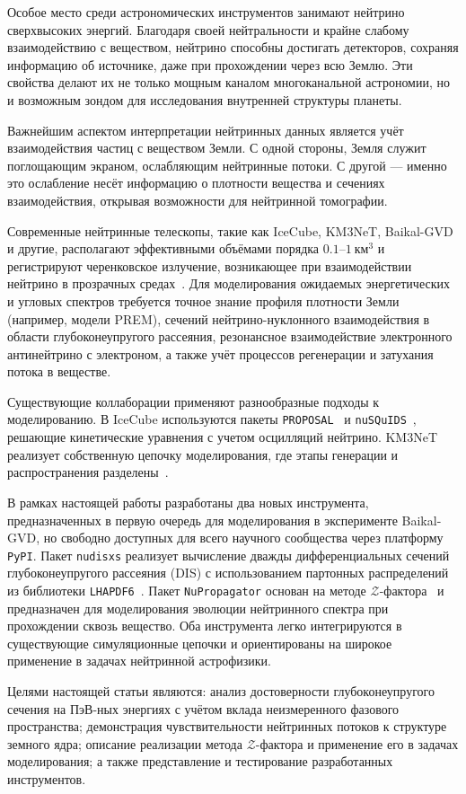 Особое место среди астрономических инструментов занимают нейтрино сверхвысоких энергий. Благодаря своей нейтральности и крайне слабому взаимодействию с веществом, нейтрино способны достигать детекторов, сохраняя информацию об источнике, даже при прохождении через всю Землю. Эти свойства делают их не только мощным каналом многоканальной астрономии, но и возможным зондом для исследования внутренней структуры планеты.

Важнейшим аспектом интерпретации нейтринных данных является учёт взаимодействия частиц с веществом Земли. С одной стороны, Земля служит поглощающим экраном, ослабляющим нейтринные потоки. С другой — именно это ослабление несёт информацию о плотности вещества и сечениях взаимодействия, открывая возможности для нейтринной томографии.

Современные нейтринные телескопы, такие как IceCube, KM3NeT, Baikal-GVD и другие, располагают эффективными объёмами порядка $0.1$–$1~\text{км}^3$ и регистрируют черенковское излучение, возникающее при взаимодействии нейтрино в прозрачных средах~\cite{Troitskii:2024}. Для моделирования ожидаемых энергетических и угловых спектров требуется точное знание профиля плотности Земли (например, модели PREM), сечений нейтрино-нуклонного взаимодействия в области глубоконеупругого рассеяния, резонансное взаимодействие электронного антинейтрино с электроном, а также учёт процессов регенерации и затухания потока в веществе.

Существующие коллаборации применяют разнообразные подходы к моделированию. В IceCube используются пакеты \texttt{PROPOSAL}~\cite{Koehne:2013gpa} и \texttt{nuSQuIDS}~\cite{ARGUELLES2022108346}, решающие кинетические уравнения с учетом осцилляций нейтрино. KM3NeT реализует собственную  цепочку моделирования, где этапы генерации и распространения разделены~\cite{ARGUELLES2022108346}. 

В рамках настоящей работы разработаны два новых инструмента, предназначенных в первую очередь для моделирования в эксперименте Baikal-GVD, но свободно доступных для всего научного сообщества через платформу \texttt{PyPI}. Пакет \texttt{nudisxs} реализует вычисление дважды дифференциальных сечений глубоконеупругого рассеяния (DIS) с использованием партонных распределений из библиотеки \texttt{LHAPDF6}~\cite{Buckley_2015}. Пакет \texttt{NuPropagator} основан на методе $\mathcal{Z}$-фактора~\cite{Naumov:1998sf} и предназначен для моделирования эволюции нейтринного спектра при прохождении сквозь вещество. Оба инструмента легко интегрируются в существующие симуляционные цепочки и ориентированы на широкое применение в задачах нейтринной астрофизики.

Целями настоящей статьи являются: анализ достоверности глубоконеупругого сечения на ПэВ-ных энергиях с учётом вклада неизмеренного фазового пространства; демонстрация чувствительности нейтринных потоков к структуре земного ядра; описание реализации метода $\mathcal{Z}$-фактора и применение его в задачах моделирования; а также представление и тестирование разработанных инструментов. 